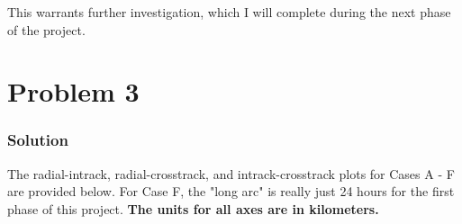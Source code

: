\documentclass[conf]{new-aiaa}
\begin{document}
This warrants further investigation, which I will complete during the next phase of the project. 


\section*{Problem 3}

\begin{center}
\end{center}



\subsubsection*{Solution} 

The radial-intrack, radial-crosstrack, and intrack-crosstrack plots for Cases A - F are provided below. For Case F, the "long arc" is really just 24 hours for the first phase of this project. \textbf{The units for all axes are in kilometers.}
\end{document}
